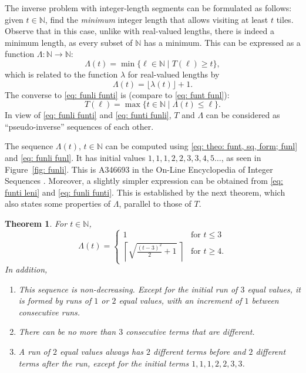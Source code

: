 \documentclass[12pt, a4paper]{article}
\newcommand{\st}{\mid}%
\newcommand{\funl}{\lambda} %
\newcommand{\funti}{T} %
\newcommand{\funli}{\Lambda} %
\newcommand{\leni}{\ell} %
\newcommand{\tiles}{t} %
\newtheorem{theorem}{Theorem}%
\begin{document}
The inverse problem with integer-length segments can be formulated as follows: given $\tiles \in \mathbb N$, find the \emph{minimum} integer length that allows visiting at least $\tiles$ tiles. Observe that in this case, unlike with real-valued lengths, there is indeed a minimum length, as every subset of $\mathbb N$ has a minimum. This can be expressed as a function $\funli: \mathbb N \to \mathbb N$:
\begin{equation}
\label{eq: funli funti}
\funli(\tiles) = \min\{\leni \in \mathbb N \st \funti(\leni) \geq \tiles\},
\end{equation}
which is related to the function $\funl$ for real-valued lengths by
\begin{equation}
\label{eq: funli funl}
\funli(\tiles) = \lfloor\funl(\tiles)\rfloor + 1.
\end{equation}
The converse to \eqref{eq: funli funti} is (compare to \eqref{eq: funt funl}):
\begin{equation}
\label{eq: funti funli}
\funti(\leni) = \max \{\tiles \in \mathbb N \st \funli(\tiles) \leq \leni\}.
\end{equation}
In view of \eqref{eq: funli funti} and \eqref{eq: funti funli}, $\funti$ and $\funli$ can be considered as ``pseudo-inverse'' sequences of each other.

The sequence $\funli(\tiles)$, $\tiles \in \mathbb N$ can be computed using \eqref{eq: theo: funt, sq, form; funl} and \eqref{eq: funli funl}. It has initial values $1, 1, 1, 2, 2, 3, 3, 4, 5 \ldots$, as seen in Figure~\ref{fig: funli}. This is A346693 in the On-Line Encyclopedia of Integer Sequences \cite{OEIS_unitsq_int_inv}. Moreover, a slightly simpler expression can be obtained from \eqref{eq: funti leni} and \eqref{eq: funli funti}. This is established by the next theorem, which also states some properties of $\funli$, parallel to those of $\funti$.

\begin{theorem}
\label{theo: funli}
For $\tiles \in \mathbb N$,
\begin{equation}
\label{eq: funli}
\funli(\tiles) = \begin{cases}
\displaystyle
1 & \text{for } \tiles \leq 3 \\[1.3mm] %
\displaystyle
\left \lceil \sqrt{\frac{(\tiles-3)^2} 2 + 1} \ \right \rceil & \text{for } \tiles \geq 4.
\end{cases}
\end{equation}
In addition,
\begin{enumerate}
\item
This sequence is non-decreasing. Except for the initial run of $3$ equal values, it is formed by runs of $1$ or $2$ equal values, with an increment of $1$ between consecutive runs.
\item
There can be no more than $3$ consecutive terms that are different.
\item
A run of $2$ equal values always has $2$ different terms before and $2$ different terms after the run, except for the initial terms $1, 1, 1, 2, 2, 3, 3$.
\end{enumerate}
\end{theorem}
\end{document}
